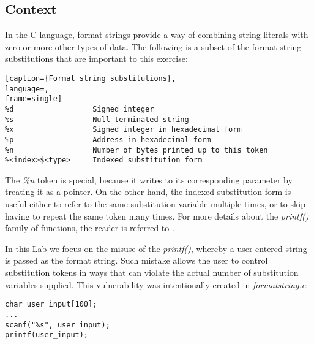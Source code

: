 
\subsection{Context}
In the C language, format strings provide a way of combining string literals with zero or more other types of data. The following is a subset of the format string substitutions that are important to this exercise:

\begin{minipage}{\linewidth}
\begin{lstlisting}[caption={Format string substitutions},
language=,
frame=single]
%d                  Signed integer
%s                  Null-terminated string
%x                  Signed integer in hexadecimal form
%p                  Address in hexadecimal form
%n                  Number of bytes printed up to this token
%<index>$<type>     Indexed substitution form
\end{lstlisting}
\end{minipage}

The \emph{\%n} token is special, because it writes to its corresponding parameter by treating it as a pointer. On the other hand, the indexed substitution form is useful either to refer to the same substitution variable multiple times, or to skip having to repeat the same token many times. For more details about the \emph{printf()} family of functions, the reader is referred to \cite{printf3}.

In this Lab we focus on the misuse of the \emph{printf()}, whereby a user-entered string is passed as the format string. Such mistake allows the user to control substitution tokens in ways that can violate the actual number of substitution variables supplied. This vulnerability was intentionally created in \emph{formatstring.c}:

\begin{minipage}{\linewidth}
\begin{lstlisting}[caption={Vulnerable part in formatstring.c},
label={lst:l1_pa_ex},
frame=single]
char user_input[100];
...
scanf("%s", user_input);
printf(user_input);
\end{lstlisting}
\end{minipage}

